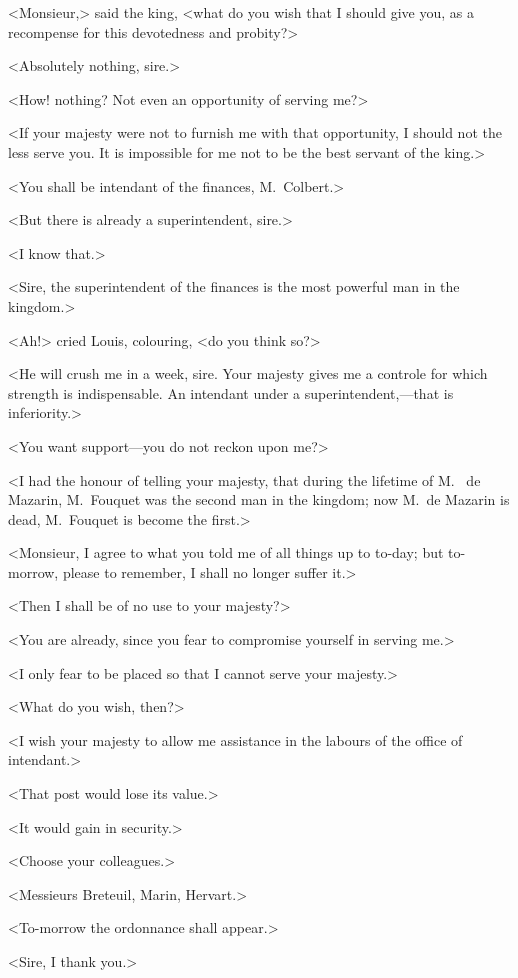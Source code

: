 <Monsieur,> said the king, <what do you wish that I should give you, as a recompense for this devotedness and probity?>

<Absolutely nothing, sire.>

<How! nothing? Not even an opportunity of serving me?>

<If your majesty were not to furnish me with that opportunity, I should not the less serve you. It is impossible for me not to be the best servant of the king.>

<You shall be intendant of the finances, M.~Colbert.>

<But there is already a superintendent, sire.>

<I know that.>

<Sire, the superintendent of the finances is the most powerful man in the kingdom.>

<Ah!> cried Louis, colouring, <do you think so?>

<He will crush me in a week, sire. Your majesty gives me a controle for which strength is indispensable. An intendant under a superintendent,—that is inferiority.>

<You want support—you do not reckon upon me?>

<I had the honour of telling your majesty, that during the lifetime of M.~ de Mazarin, M.~Fouquet was the second man in the kingdom; now M.~de Mazarin is dead, M.~Fouquet is become the first.>

<Monsieur, I agree to what you told me of all things up to to-day; but to-morrow, please to remember, I shall no longer suffer it.>

<Then I shall be of no use to your majesty?>

<You are already, since you fear to compromise yourself in serving me.>

<I only fear to be placed so that I cannot serve your majesty.>

<What do you wish, then?>

<I wish your majesty to allow me assistance in the labours of the office of intendant.>

<That post would lose its value.>

<It would gain in security.>

<Choose your colleagues.>

<Messieurs Breteuil, Marin, Hervart.>

<To-morrow the ordonnance shall appear.>

<Sire, I thank you.>

